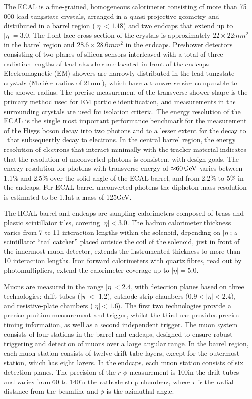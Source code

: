 \documentclass[12pt,twoside,a4paper,cmspaper,final,collab]{cms-tdr}
\begin{document}
The ECAL is a fine-grained, homogeneous calorimeter consisting of more than 75\,000
lead tungstate crystals, arranged in a quasi-projective geometry and distributed in a
barrel region ($|\eta| < 1.48$) and two endcaps that extend up to $|\eta| = 3.0$.
The front-face cross section of the crystals is approximately $22\times 22\unit{mm}^2$ in the barrel region
and $28.6\times 28.6\unit{mm}^2$ in the endcaps.
Preshower detectors consisting of two planes of silicon sensors interleaved with a total of
three radiation lengths of lead absorber are located in front of the endcaps.  Electromagnetic (EM)
showers
are narrowly distributed in the lead tungstate crystals (Moli\`ere radius of 21\unit{mm}), which have a transverse size
comparable to the shower radius.  The precise measurement of the transverse shower shape is the
primary method used for EM particle identification, and measurements in the surrounding crystals
are used for isolation criteria.
The energy resolution of the ECAL is the single most important performance
benchmark for the measurement of the Higgs boson decay into two photons and to a lesser extent
for the decay to \cPZ\cPZ\ that subsequently decay to electrons.
In the central barrel region, the energy resolution of electrons that
interact minimally with the tracker material indicates that the resolution of
unconverted photons is consistent with design goals.
The energy resolution for photons with transverse energy of ${\approx}60\,\text{Ge\hspace{-.08em}V}$ varies
between 1.1\% and 2.5\% over the solid angle of the ECAL barrel, and from 2.2\% to 5\% in the endcaps.
For ECAL barrel unconverted photons the diphoton mass resolution is estimated to be
1.1\GeV at a mass of 125\unit{GeV}.


The HCAL barrel and endcaps are sampling calorimeters composed of brass and
plastic scintillator tiles, covering $|\eta| < 3.0$. The hadron calorimeter thickness varies from 7 to 11
interaction lengths within the solenoid, depending on $|\eta|$; a scintillator ``tail catcher'' placed outside
the coil of the solenoid, just in front of the innermost muon detector, extends the instrumented thickness
to more
than 10 interaction lengths.  Iron forward calorimeters with quartz fibres, read
out by photomultipliers, extend the calorimeter coverage up to
$|\eta| = 5.0$.

Muons are measured in the range $|\eta| < 2.4$, with detection planes based on
three technologies: drift tubes ($|\eta| <$ 1.2), cathode strip chambers
($0.9 < |\eta| < 2.4$), and resistive-plate chambers ($|\eta| < 1.6$).
The first two technologies provide a precise position measurement and
trigger, whilst the third one provides precise timing
information, as well as a second independent trigger.
The muon system consists of four stations in the barrel and endcaps, designed to ensure robust
triggering and detection of muons
over a large angular range. In the barrel region, each muon station consists of twelve
drift-tube layers, except for the outermost station, which has eight layers. In the endcaps, each
muon station consists of six detection planes. The precision of the $r$-$\phi$
measurement is 100\mum in the drift tubes and varies from 60 to
140\mum in the cathode strip chambers, where $r$ is the radial distance from the beamline and $\phi$
is the azimuthal angle.
\end{document}
